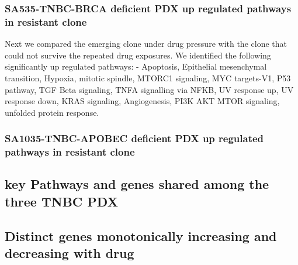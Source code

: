 \subsubsection{SA535-TNBC-BRCA deficient PDX up regulated pathways in resistant clone}
Next we compared the emerging clone under drug pressure with the clone that could not survive the repeated drug exposures. We identified the following significantly up regulated pathways:
- Apoptosis, Epithelial mesenchymal transition, Hypoxia, mitotic spindle, MTORC1 signaling, MYC targets-V1, P53 pathway, TGF Beta signaling, TNFA signalling via NFKB, UV response up, UV response down, KRAS signaling, Angiogenesis, PI3K AKT MTOR signaling, unfolded protein response.


\subsubsection{SA1035-TNBC-APOBEC deficient PDX up regulated pathways in resistant clone}




\subsection{key Pathways and genes shared among the three TNBC PDX}




\subsection{Distinct genes monotonically increasing and decreasing with drug} 


